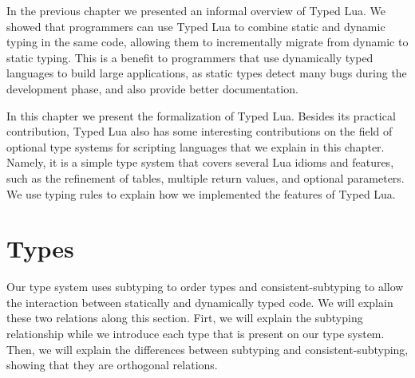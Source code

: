 
In the previous chapter we presented an informal overview of Typed Lua.
We showed that programmers can use Typed Lua to combine static and dynamic
typing in the same code, allowing them to incrementally migrate from
dynamic to static typing.
This is a benefit to programmers that use dynamically typed languages
to build large applications, as static types detect many bugs
during the development phase, and also provide better documentation.

In this chapter we present the formalization of Typed Lua.
Besides its practical contribution, Typed Lua also has some interesting
contributions on the field of optional type systems for scripting
languages that we explain in this chapter.
Namely, it is a simple type system that covers several Lua idioms
and features, such as the refinement of tables, multiple return values,
and optional parameters.
We use typing rules to explain how we implemented the features of Typed Lua.

\section{Types}

Our type system uses subtyping \citep{abadi1996to,cardelli1984smi} to order
types and consistent-subtyping \citep{siek2007objects,siek2013mutable}
to allow the interaction between statically and dynamically typed code.
We will explain these two relations along this section.
Firt, we will explain the subtyping relationship while we introduce
each type that is present on our type system.
Then, we will explain the differences between subtyping and
consistent-subtyping, showing that they are orthogonal relations.

